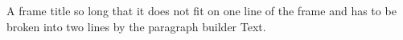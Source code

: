 \documentclass[8pt]{beamer}
\begin{document}
\begin{frame}{A frame title so long that it does not fit on one line of the frame and has to be broken into two lines by the paragraph builder}
Text.
\end{frame}
\end{document}
